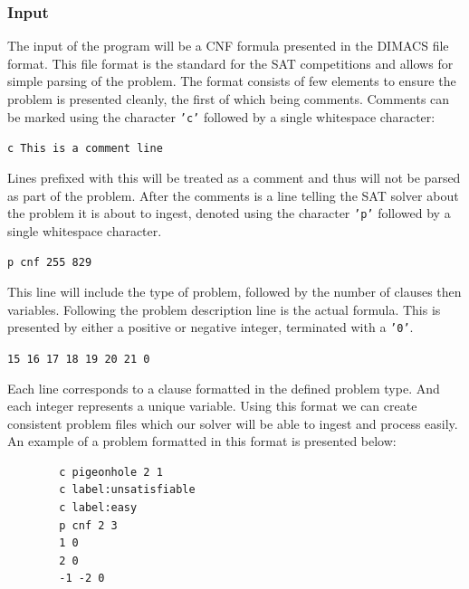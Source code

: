 \documentclass{article}
\begin{document}
\subsubsection{Input}
The input of the program will be a CNF formula presented in the DIMACS file format. This file format
is the standard for the SAT competitions and allows for simple parsing of the problem. The format
consists of few elements to ensure the problem is presented cleanly, the first of which being
comments. Comments can be marked using the character \texttt{'c'} followed by a single whitespace
character:

\begin{center}
    \texttt{c This is a comment line}
\end{center}

Lines prefixed with this will be treated as a
comment and thus will not be parsed as part of the problem. After the comments is a line telling the
SAT solver about the problem it is about to ingest, denoted using the character \texttt{'p'}
followed by a single whitespace character.

\begin{center}
    \texttt{p cnf 255 829}
\end{center}

This line will include the type of problem, followed by the number of clauses then
variables. Following the problem description line is the actual formula. This is presented by either
a positive or negative integer, terminated with a \texttt{'0'}.

\begin{center}
    \texttt{15 16 17 18 19 20 21 0}
\end{center}

Each line corresponds to a clause formatted in the defined problem type. And each integer represents
a unique variable. Using this format we can create consistent problem files which our solver will be
able to ingest and process easily. An example of a problem formatted in this format is presented
below:

\begin{center}
    \begin{lstlisting}
        c pigeonhole 2 1
        c label:unsatisfiable
        c label:easy
        p cnf 2 3
        1 0
        2 0
        -1 -2 0
    \end{lstlisting}
\end{center}
\end{document}
